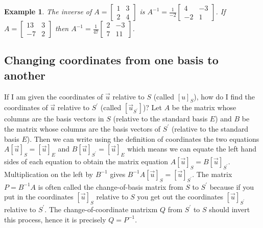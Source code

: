 \documentclass[10pt]{article}
\theoremstyle{plain}
\theoremstyle{box}
\newtheorem{example}{Example}
\newcommand{\ds}{\displaystyle}
\begin{document}
\begin{example} 
The inverse of 
$A=
\begin{bmatrix}
 1 & 3 \\
 2 & 4
\end{bmatrix}
$ 
is 
$A^{-1}=
\ds\frac{1}{-2}\begin{bmatrix}
 4 & -3 \\
 -2 & 1
\end{bmatrix}
$.
If 
$A=
\begin{bmatrix}
 13 & 3 \\
 -7 & 2
\end{bmatrix}
$ 
then
$A^{-1}=
\ds\frac{1}{47}\begin{bmatrix}
 2 & -3 \\
 7 & 11
\end{bmatrix}
$.
\end{example}


\subsection{Changing coordinates from one basis to another}

If I am given the coordinates of $\vec u$ relative to $S$ (called $[u]_S$), how do I find the coordinates of $\vec u$ relative to $S^\prime$ (called $[\vec u_{S^\prime}]$)? Let $A$ be the matrix whose columns are the basis vectors in $S$ (relative to the standard basis $E$) and $B$ be the matrix whose columns are the basis vectors of $S^\prime$ (relative to the standard basis $E$). Then we can write using the definition of coordinates the two equations $A[\vec u]_S=[\vec u]_E$ and $B[\vec u]_{S^\prime}=[\vec u]_E$ which means we can equate the left hand sides of each equation to obtain the matrix equation 
$A[\vec u]_S=B[\vec u]_{S^\prime}$. Multiplication on the left by $B^{-1}$ gives $B^{-1}A[\vec u]_S=[\vec u]_{S^\prime}$.  The matrix $P=B^{-1}A$ is often called the change-of-basis matrix from $S$ to $S^\prime$ because if you put in the coordinates  $[\vec u]_S$ relative to $S$ you get out the coordinates $[\vec u]_{S^\prime}$ relative to $S^\prime$. The change-of-coordinate matrixm $Q$ from $S^\prime$ to $S$ should invert this process, hence it is precisely $Q=P^{-1}$.
\end{document}
